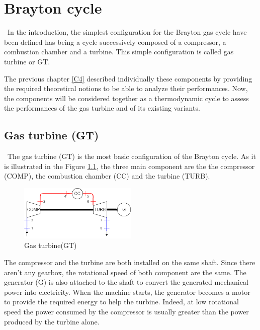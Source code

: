 \graphicspath{{Chapitre_5/Images/}}
\chapter{Brayton cycle}\label{C5}
\quad\, In the introduction, the simplest configuration for the Brayton gas cycle have been defined has being a cycle successively composed of a compressor, a combustion chamber and a turbine. This simple configuration is called gas turbine or GT. 

The previous chapter \ref{C4} described individually these components by providing the required theoretical notions to be able to analyze their performances. Now, the components will be considered together as a thermodynamic cycle to assess the performances of the gas turbine and of its existing variants.

\section{Gas turbine (GT)}
\quad\, The gas turbine (GT) is the most basic configuration of the Brayton cycle. As it is illustrated in the Figure \ref{fig:C5_BraytonGT}, the three main component are the the compressor (COMP), the combustion chamber (CC) and the turbine (TURB).

\begin{figure}[h]
\centering
\includegraphics[width=0.5\textwidth] {GT}
\caption{Gas turbine(GT)}
\label{fig:C5_BraytonGT}
\end{figure}

The compressor and the turbine are both installed on the same shaft. Since there aren't any gearbox, the rotational speed of both component are the same. The generator (G) is also attached to the shaft to convert the generated mechanical power into electricity. 
When the machine starts, the generator becomes a motor to provide the required energy to help the turbine. Indeed, at low rotational speed the power consumed by the compressor is usually greater than the power produced by the turbine alone. 



